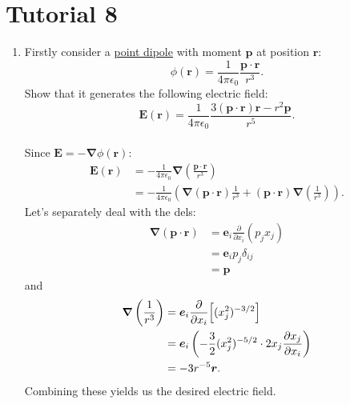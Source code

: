 \pagestyle{fancy}
\fancyhead{}

\section{Tutorial 8}
\begin{enumerate}
    \item Firstly consider a
    \underline{point dipole} with moment $\boldsymbol{p}$
    at position $\boldsymbol{r}$:
    $$\phi(\boldsymbol{r})=\frac{1}{4\pi\epsilon_0}
    \frac{\boldsymbol{p}\cdot\boldsymbol{r}}{r^3}.$$
    Show that it generates the following electric field:
    $$\boldsymbol{E}(\boldsymbol{r})
    =\frac{1}{4\pi\epsilon_0}
    \frac{3(\boldsymbol{p}\cdot\boldsymbol{r})
    \boldsymbol{r}-r^2\boldsymbol{p}}{r^5}.$$ \\

    Since $\boldsymbol{E}=-\boldsymbol{\nabla}
    \phi(\boldsymbol{r})$:
    \begin{align*}
        \boldsymbol{E}(\boldsymbol{r})
        &=-\frac{1}{4\pi\epsilon_0}\boldsymbol{\nabla}
        \left(\frac{\boldsymbol{p}\cdot\boldsymbol{r}}{r^3}\right) \\
        &=-\frac{1}{4\pi\epsilon_0}
        \left(\boldsymbol{\nabla}(\boldsymbol{p}\cdot\boldsymbol{r})\frac{1}{r^3}
        +(\boldsymbol{p}\cdot\boldsymbol{r})
        \boldsymbol{\nabla}\left(\frac{1}{r^3}\right)\right).
    \end{align*}
    Let's separately deal with the dels:
    \begin{align*}
        \boldsymbol{\nabla}(\boldsymbol{p}\cdot\boldsymbol{r})
        &=\boldsymbol{e}_i\frac{\partial}{\partial x_i}
        (p_j x_j) \\
        &=\boldsymbol{e}_i p_j\delta_{ij} \\
        &=\boldsymbol{p}
    \end{align*}
    and
    \begin{align*}
        \boldsymbol{\nabla}\left(\frac{1}{r^3}\right)
        &=\boldsymbol{e}_i\frac{\partial}{\partial x_i}
        \Bigl[(x_j^2)^{-3/2}\Bigr] \\
        &=\boldsymbol{e}_i\left(
        -\frac{3}{2}(x_j^2)^{-5/2}
        \cdot 2x_j\frac{\partial x_j}{\partial x_i}
        \right) \\
        &=-3r^{-5}\boldsymbol{r}.
    \end{align*}
    Combining these yields us the desired electric field.
\end{enumerate}